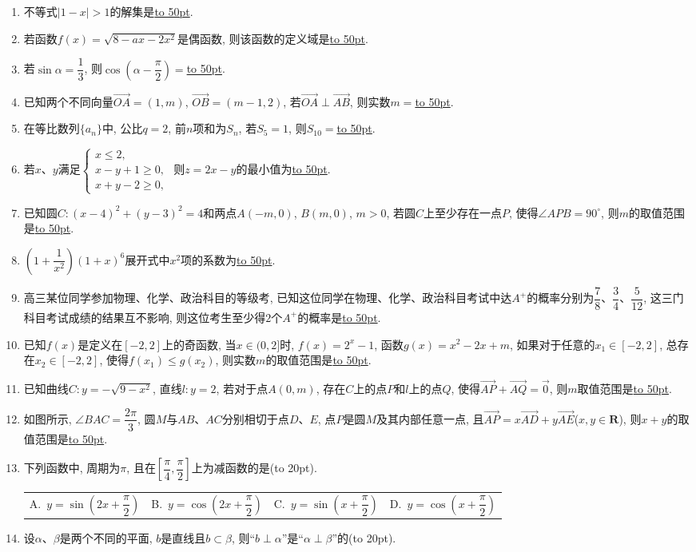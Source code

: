 \documentclass[10pt,a4paper]{article}
\newcommand{\blank}[1]{\underline{\hbox to #1pt{}}}
\newcommand{\bracket}[1]{(\hbox to #1pt{})}
\newcommand{\fourch}[4]{\par\begin{tabular}{p{.23\textwidth}p{.23\textwidth}p{.23\textwidth}p{.23\textwidth}}
A.~#1 &B.~#2& C.~#3& D.~#4
\end{tabular}}
\begin{document}
\begin{enumerate}[1.]
\item 不等式$|1-x|>1$的解集是\blank{50}.
\item 若函数$f(x)=\sqrt {8-ax-2x^2}$是偶函数, 则该函数的定义域是\blank{50}.
\item 若$\sin \alpha =\dfrac 13$, 则$\cos (\alpha -\dfrac{\pi }2)=$\blank{50}.
\item 已知两个不同向量$\overrightarrow{OA}=(1,m)$, $\overrightarrow{OB}=(m-1,2)$, 若$\overrightarrow{OA}\perp \overrightarrow{AB}$, 则实数$m=$\blank{50}.
\item 在等比数列$\{a_n\}$中, 公比$q=2$, 前$n$项和为$S_n$, 若$S_5=1$, 则$S_{10}=$\blank{50}.
\item 若$x$、$y$满足$\begin{cases} x\le 2, \\ x-y+1\ge 0, \\ x+y-2\ge 0, \end{cases}$ 则$z=2x-y$的最小值为\blank{50}.
\item 已知圆$C:(x-4)^2+(y-3)^2=4$和两点$A(-m,0)$, $B(m,0)$, $m>0$, 若圆$C$上至少存在一点$P$, 使得$\angle APB=90^\circ$, 则$m$的取值范围是\blank{50}.
\item $(1+\dfrac 1{x^2})(1+x)^6$展开式中$x^2$项的系数为\blank{50}.
\item 高三某位同学参加物理、化学、政治科目的等级考, 已知这位同学在物理、化学、政治科目考试中达$A^+$的概率分别为$\dfrac 78$、$\dfrac 34$、$\dfrac 5{12}$, 这三门科目考试成绩的结果互不影响, 则这位考生至少得$2$个$A^+$的概率是\blank{50}.
\item 已知$f(x)$是定义在$[-2,2]$上的奇函数, 当$x\in (0,2]$时, $f(x)=2^x-1$, 函数$g(x)=x^2-2x+m$, 如果对于任意的$x_1\in [-2,2]$, 总存在$x_2\in [-2,2]$, 使得$f(x_1)\le g(x_2)$, 则实数$m$的取值范围是\blank{50}.
\item 已知曲线$C:y=-\sqrt {9-x^2}$, 直线$l:y=2$, 若对于点$A(0,m)$, 存在$C$上的点$P$和$l$上的点$Q$, 使得$\overrightarrow{AP}+\overrightarrow{AQ}=\overrightarrow 0$, 则$m$取值范围是\blank{50}.
\item 如图所示, $\angle BAC=\dfrac{2\pi}3$, 圆$M$与$AB$、$AC$分别相切于点$D$、$E$, 点$P$是圆$M$及其内部任意一点, 且$\overrightarrow{AP}=x\overrightarrow{AD}+y\overrightarrow{AE}$($x,y\in \mathbf{R}$), 则$x+y$的取值范围是\blank{50}.
\item 下列函数中, 周期为$\pi$, 且在$[\dfrac{\pi }4,\dfrac{\pi }2]$上为减函数的是\bracket{20}.
\fourch{$y=\sin (2x+\dfrac{\pi }2)$}{$y=\cos (2x+\dfrac{\pi }2)$}{$y=\sin (x+\dfrac{\pi }2)$}{$y=\cos (x+\dfrac{\pi }2)$}
\item 设$\alpha$、$\beta$是两个不同的平面, $b$是直线且$b\subset\beta$, 则``$b\perp \alpha$''是``$\alpha \perp \beta$''的\bracket{20}.

\end{enumerate}
\end{document}
